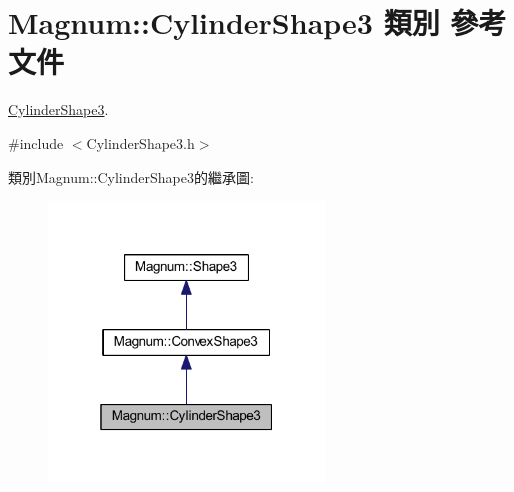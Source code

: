 \hypertarget{class_magnum_1_1_cylinder_shape3}{}\section{Magnum\+:\+:Cylinder\+Shape3 類別 參考文件}
\label{class_magnum_1_1_cylinder_shape3}


\hyperlink{class_magnum_1_1_cylinder_shape3}{Cylinder\+Shape3}.  




{\ttfamily \#include $<$Cylinder\+Shape3.\+h$>$}



類別\+Magnum\+:\+:Cylinder\+Shape3的繼承圖\+:\nopagebreak
\begin{figure}[H]
\begin{center}
\leavevmode
\includegraphics[width=208pt]{class_magnum_1_1_cylinder_shape3__inherit__graph}
\end{center}
\end{figure}


